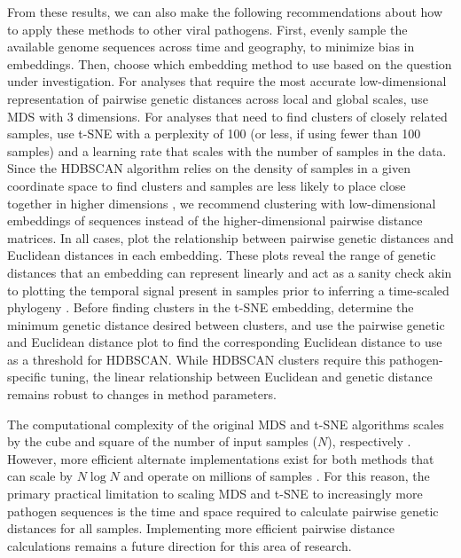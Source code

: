 \documentclass[webpdf,contemporary,large,single]{oup-authoring-template}%
\theoremstyle{thmstyleone}%
\theoremstyle{thmstyletwo}%
\theoremstyle{thmstylethree}%
\begin{document}
From these results, we can also make the following recommendations about how to apply these methods to other viral pathogens.
First, evenly sample the available genome sequences across time and geography, to minimize bias in embeddings.
Then, choose which embedding method to use based on the question under investigation.
For analyses that require the most accurate low-dimensional representation of pairwise genetic distances across local and global scales, use MDS with 3 dimensions.
For analyses that need to find clusters of closely related samples, use t-SNE with a perplexity of 100 (or less, if using fewer than 100 samples) and a learning rate that scales with the number of samples in the data.
Since the HDBSCAN algorithm relies on the density of samples in a given coordinate space to find clusters and samples are less likely to place close together in higher dimensions \citep{campello2015hierarchical}, we recommend clustering with low-dimensional embeddings of sequences instead of the higher-dimensional pairwise distance matrices.
In all cases, plot the relationship between pairwise genetic distances and Euclidean distances in each embedding.
These plots reveal the range of genetic distances that an embedding can represent linearly and act as a sanity check akin to plotting the temporal signal present in samples prior to inferring a time-scaled phylogeny \citep{Rambaut2016,Sagulenko2018}.
Before finding clusters in the t-SNE embedding, determine the minimum genetic distance desired between clusters, and use the pairwise genetic and Euclidean distance plot to find the corresponding Euclidean distance to use as a threshold for HDBSCAN.
While HDBSCAN clusters require this pathogen-specific tuning, the linear relationship between Euclidean and genetic distance remains robust to changes in method parameters.

The computational complexity of the original MDS and t-SNE algorithms scales by the cube and square of the number of input samples ($N$), respectively \citep{Yang2006,maaten2008visualizing}.
However, more efficient alternate implementations exist for both methods that can scale by $N\log{N}$ and operate on millions of samples \citep{Yang2006,Delicado2024,Yang2013,vandermaaten2013,vandermaaten2014}.
For this reason, the primary practical limitation to scaling MDS and t-SNE to increasingly more pathogen sequences is the time and space required to calculate pairwise genetic distances for all samples.
Implementing more efficient pairwise distance calculations remains a future direction for this area of research.
\end{document}
